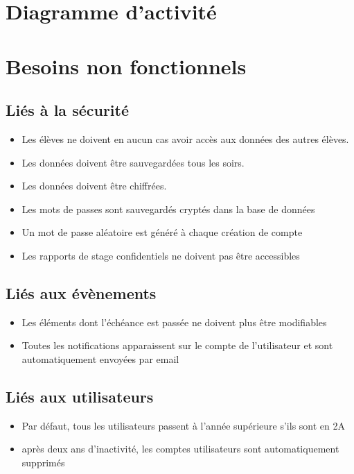 \documentclass{scrreprt}
\begin{document}
\section{Diagramme d'activité}


\section{Besoins non fonctionnels}
\subsection{Li\'es \`a la s\'ecurit\'e}
\begin{itemize}
\item Les \'el\`eves ne doivent en aucun cas avoir acc\`es aux donn\'ees des autres \'el\`eves.
\item Les donn\'ees doivent \^etre sauvegard\'ees tous les soirs.
\item Les donn\'ees doivent \^etre chiffr\'ees.
\item Les mots de passes sont sauvegard\'es crypt\'es dans la base de donn\'ees
\item Un mot de passe al\'eatoire est g\'en\'er\'e \`a chaque cr\'eation de compte
\item Les rapports de stage confidentiels ne doivent pas \^etre accessibles
\end{itemize}

\subsection{Li\'es aux \'ev\`enements}
\begin{itemize}
\item Les \'el\'ements dont l’\'ech\'eance est pass\'ee ne doivent plus \^etre modifiables
\item Toutes les notifications apparaissent sur le compte de l’utilisateur et sont automatiquement envoy\'ees par email
\end{itemize}

\subsection{Li\'es aux utilisateurs}
\begin{itemize}
\item Par d\'efaut, tous les utilisateurs passent \`a l’ann\'ee sup\'erieure s’ils sont en 2A
\item apr\`es deux ans d’inactivit\'e, les comptes utilisateurs sont automatiquement supprim\'es
\end{itemize}
\end{document}
